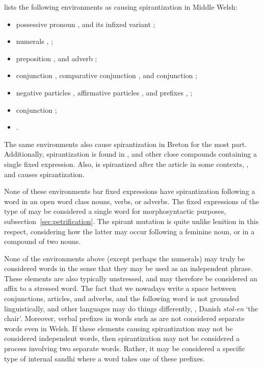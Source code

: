 \Autocite[\S 24]{evans_grammar_1964} lists the following environments as causing spirantization in  Middle Welsh:
\begin{itemize}
\item possessive pronoun , and its infixed variant ;
\item numerals , ;
\item preposition , and adverb ;
\item conjunction , comparative conjunction , and conjunction ;
\item negative particles , affirmative particles , and prefixes , \etc;
\item conjunction ;
\item {}.
\end{itemize}
The same environments also cause spirantization in Breton for the most part. Additionally,  spirantization is found in , and other close compounds containing a single fixed expression.
Also,  is spirantized after the article in some contexts, \eg {}, and  causes spirantization.

None of these environments bar fixed expressions have spirantization following a word in an open word class \ie nouns, verbs, or adverbs.
The fixed expressions of the type of  may be considered a single word for morphosyntactic purposes, \cf subsection~\ref{sec:petrification}.
The spirant mutation is quite unlike lenition in this respect, considering how the latter may occur \eg following a feminine noun, or in a compound of two nouns.

None of the environments above (except perhaps the numerals) may truly be considered words in the sense that they may be used as an independent phrase.
These elements are also typically unstressed, and may therefore be considered an affix to a stressed word.
The fact that we nowadays write a space between conjunctions, articles, and adverbs, \etc and the following word is not grounded linguistically, and other languages may do things differently, \eg {}, Danish \textit{stol-en} `the chair'.
Moreover, verbal prefixes in words such as  are not considered separate words even in Welsh.
If  these elements causing spirantization may not be considered independent words, then spirantization may not be considered a process involving two separate words.
Rather, it may be considered a specific type of internal sandhi where a word takes one of these prefixes.

